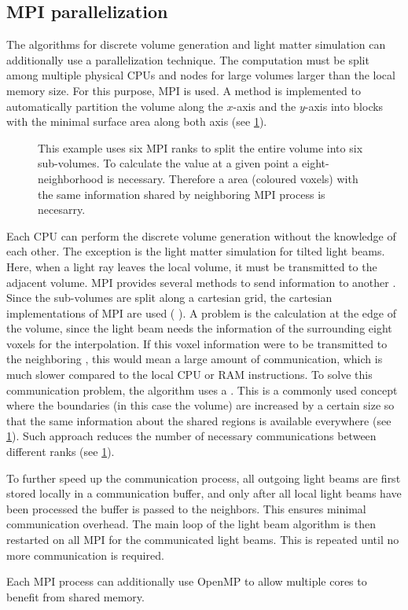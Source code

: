 \subsection{MPI parallelization}\label{sec:mpiSim}
%
The algorithms for discrete volume generation and light matter simulation can additionally use a parallelization technique.
The computation must be split among multiple physical \acp{CPU} and nodes for large volumes larger than the local memory size.
For this purpose,  \ac{MPI} is used.
A method is implemented to automatically partition the volume along the $x$-axis and the $y$-axis into blocks with the minimal surface area along both axis (see \cref{fig:com_halo}).
\par
%
\begin{figure}[!t]
    \centering
    \setlength{\tikzwidth}{0.85\textwidth}
    \caption{ This example uses six \ac{MPI} ranks to split the entire volume into six sub-volumes. To calculate the value at a given point a eight-neighborhood is necessary. Therefore a  area (coloured voxels) with the same information shared by neighboring \ac{MPI} process is necesarry.}
    \label{fig:com_halo}
\end{figure}
% 
Each \ac{CPU} can perform the discrete volume generation without the knowledge of each other.
The exception is the light matter simulation for tilted light beams.
Here, when a light ray leaves the local volume, it must be transmitted to the adjacent volume.
\ac{MPI} provides several methods to send information to another .
Since the sub-volumes are split along a cartesian grid, the cartesian implementations of \ac{MPI} are used (\eg{} ).
A problem is the calculation at the edge of the volume, since the light beam needs the information of the surrounding eight voxels for the interpolation.
If this voxel information were to be transmitted to the neighboring , this would mean a large amount of communication, which is much slower compared to the local \ac{CPU} or \ac{RAM} instructions.
To solve this communication problem, the algorithm uses a .
This is a commonly used concept where the boundaries (in this case the volume) are increased by a certain size so that the same information about the shared regions is available everywhere (see \cref{fig:com_halo}).
Such approach reduces the number of necessary communications between different ranks (see \cref{fig:com_halo}).
\par
% 
To further speed up the communication process, all outgoing light beams are first stored locally in a communication buffer, and only after all local light beams have been processed the buffer is passed to the neighbors.
This ensures minimal communication overhead.
The main loop of the light beam algorithm is then restarted on all \ac{MPI}  for the communicated light beams.
This is repeated until no more communication is required.
\par
%
Each \ac{MPI} process can additionally use \ac{OpenMP} to allow multiple cores to benefit from shared memory.
